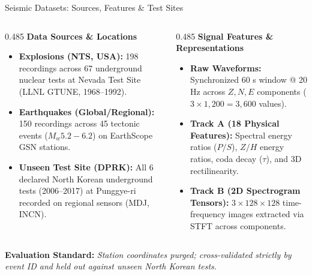 \documentclass[aspectratio=169,11pt]{beamer}
\begin{document}
\begin{frame}{Seismic Datasets: Sources, Features \& Test Sites}
  \par
  \vspace*{0.08cm}

  \begin{columns}[T,onlytextwidth]
    \begin{column}{0.485\textwidth}
      \textbf{\small\color{navy} Data Sources \& Locations}
      \vspace*{0.06cm}
      \begin{itemize}\setlength{\itemsep}{0.25em}\footnotesize
        \item \textbf{Explosions (NTS, USA):} 198 recordings across 67 underground nuclear tests at Nevada Test Site (LLNL GTUNE, 1968--1992).
        \item \textbf{Earthquakes (Global/Regional):} 150 recordings across 45 tectonic events ($M_w 5.2 - 6.2$) on EarthScope GSN stations.
        \item \textbf{Unseen Test Site (DPRK):} All 6 declared North Korean underground tests (2006--2017) at Punggye-ri recorded on regional sensors (MDJ, INCN).
      \end{itemize}
    \end{column}
    \hfill
    \begin{column}{0.485\textwidth}
      \textbf{\small\color{blastred} Signal Features \& Representations}
      \vspace*{0.06cm}
      \begin{itemize}\setlength{\itemsep}{0.25em}\footnotesize
        \item \textbf{Raw Waveforms:} Synchronized 60 s window @ 20 Hz across $Z, N, E$ components ($3 \times 1,200 = 3,600$ values).
        \item \textbf{Track A (18 Physical Features):} Spectral energy ratios ($P/S$), $Z/H$ energy ratios, coda decay ($\tau$), and 3D rectilinearity.
        \item \textbf{Track B (2D Spectrogram Tensors):} $3 \times 128 \times 128$ time-frequency images extracted via STFT across components.
      \end{itemize}
    \end{column}
  \end{columns}

  \vspace*{0.12cm}
  \centering
  \footnotesize \textbf{\color{tealaccent} Evaluation Standard:} \textit{Station coordinates purged; cross-validated strictly by event ID and held out against unseen North Korean tests.}
\end{frame}
\end{document}
